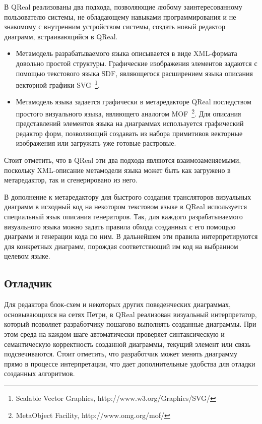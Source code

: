 \documentclass[a4paper]{article}
\begin{document}
В QReal реализованы два подхода, позволяющие любому заинтересованному пользователю системы, не обладающему навыками программирования и не знакомому с внутренним устройством системы, создать новый редактор диаграмм, встраивающийся в QReal.
\begin{itemize}
  \item Метамодель разрабатываемого языка описывается в виде XML-формата довольно простой структуры. Графические изображения элементов задаются с помощью текстового языка SDF, являющегося расширением языка описания векторной графики SVG~\footnote{Scalable Vector Graphics, http://www.w3.org/Graphics/SVG/}.
  \item Метамодель языка задается графически в метаредакторе QReal последством простого визуального языка, являющего аналогом MOF~\footnote{MetaObject Facility, http://www.omg.org/mof/}. Для описания представлений элементов языка на диаграммах используется графический редактор форм, позволяющий создавать из набора примитивов векторные изображения или загружать уже готовые растровые.
\end{itemize}
Стоит отметить, что в QReal эти два подхода являются взаимозаменяемыми, поскольку XML-описание метамодели языка может быть как загружено в метаредактор, так и сгенерировано из него. 

В дополнение к метаредактору для быстрого создания трансляторов визуальных диаграмм в исходный код на некотором текстовом языке в QReal используется специальный язык описания генераторов. Так, для каждого разрабатываемого визуального языка можно задать правила обхода созданных с его помощью диаграмм и генерации кода по ним. В дальнейшем эти правила интерпретируются для конкретных диаграмм, порождая соответствющий им код на выбранном целевом языке.
  
\subsection{Отладчик}

Для редактора блок-схем и некоторых других поведенческих диаграммах, основывающихся на сетях Петри, в QReal реализован визуальный интерпретатор, который позволяет разработчику пошагово выполнять созданные диаграммы. При этом среда на каждом шаге автоматически проверяет синтаксическую и семантическую корректность созданной диаграммы, текущий элемент или связь подсвечиваются. Стоит отметить, что разработчик может менять диаграмму прямо в процессе интерпретации, что дает дополнительные удобства для отладки созданных алгоритмов. 
  
\end{document}
